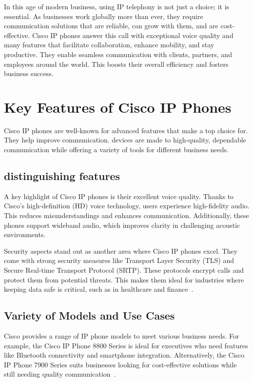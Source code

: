 \documentclass[11pt,a4paper]{article}
\begin{document}
In this age of modern business, using IP telephony is not just a choice; it is essential. As businesses work globally more than ever, they require communication solutions that are reliable, can grow with them, and are cost-effective. Cisco IP phones answer this call with exceptional voice quality and many features that facilitate collaboration, enhance mobility, and stay productive. They enable seamless communication with clients, partners, and employees around the world. This boosts their overall efficiency and fosters business success.

\section*{Key Features of Cisco IP Phones}

Cisco IP phones are well-known for advanced features that make a top choice for. They help improve communication. devices are made to high-quality, dependable communication while offering a variety of tools for different business needs.

\subsection*{distinguishing features}

A key highlight of Cisco IP phones is their excellent voice quality. Thanks to Cisco's high-definition (HD) voice technology, users experience high-fidelity audio. This reduces misunderstandings and enhances communication. Additionally, these phones support wideband audio, which improves clarity in challenging acoustic environments.

Security aspects stand out as another area where Cisco IP phones excel. They come with strong security measures like Transport Layer Security (TLS) and Secure Real-time Transport Protocol (SRTP). These protocols encrypt calls and protect them from potential threats. This makes them ideal for industries where keeping data safe is critical, such as in healthcare and finance~\cite{Security-Features}.


\subsection*{Variety of Models and Use Cases}

Cisco provides a range of IP phone models to meet various business needs. For example, the Cisco IP Phone 8800 Series is ideal for executives who need features like Bluetooth connectivity and smartphone integration. Alternatively, the Cisco IP Phone 7900 Series suits businesses looking for cost-effective solutions while still needing quality communication~\cite{8800-series}.
\end{document}
